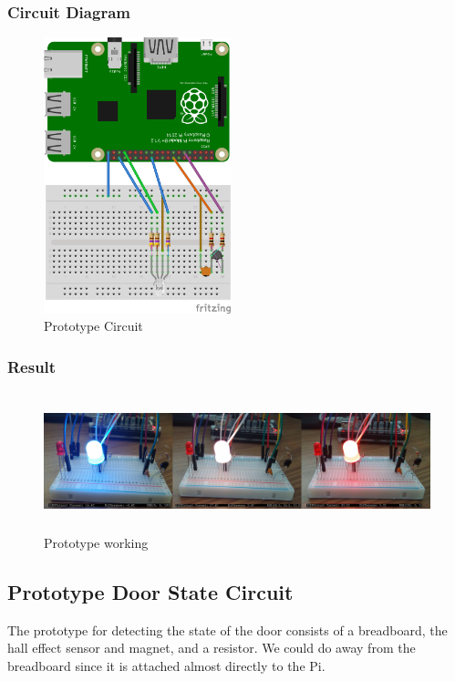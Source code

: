 \documentclass[10pt]{article}
\begin{document}
\subsubsection{Circuit Diagram}
\begin{figure}[h]
\centering
\caption{Prototype Circuit}
\label{Prototype Circuit}
\includegraphics[height=8cm]{images/prototypeDiagram.png}
\end{figure}

\subsubsection{Result}
\begin{figure}[h]
\centering
\caption{Prototype working}
\label{Prototype working}
\includegraphics[height=4cm]{images/tempsenproto.png}
\end{figure}
\pagebreak
\subsection{Prototype Door State Circuit}

The prototype for detecting the state of the door consists of a breadboard, the hall effect sensor and magnet, and a resistor. We could do away from the breadboard since it is attached almost directly to the Pi.
\end{document}
